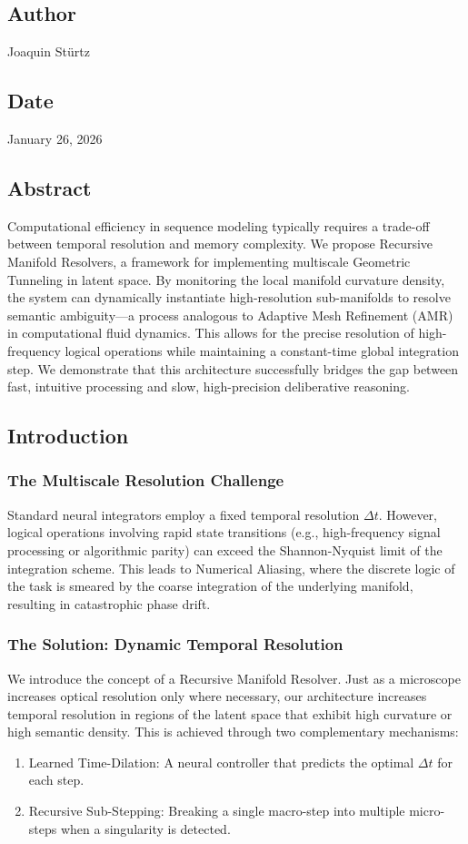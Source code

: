 \documentclass{article}
\numberwithin{equation}{section}
\begin{document}
\subsection*{Author}
Joaquin Stürtz
\subsection*{Date}
January 26, 2026
\subsection*{Abstract}
Computational efficiency in sequence modeling typically requires a trade-off between temporal resolution and memory complexity. We propose Recursive Manifold Resolvers, a framework for implementing multiscale Geometric Tunneling in latent space. By monitoring the local manifold curvature density, the system can dynamically instantiate high-resolution sub-manifolds to resolve semantic ambiguity---a process analogous to Adaptive Mesh Refinement (AMR) in computational fluid dynamics. This allows for the precise resolution of high-frequency logical operations while maintaining a constant-time global integration step. We demonstrate that this architecture successfully bridges the gap between fast, intuitive processing and slow, high-precision deliberative reasoning.

\subsection{Introduction}
\subsubsection{The Multiscale Resolution Challenge}
Standard neural integrators employ a fixed temporal resolution $\Delta t$. However, logical operations involving rapid state transitions (e.g., high-frequency signal processing or algorithmic parity) can exceed the Shannon-Nyquist limit of the integration scheme. This leads to Numerical Aliasing, where the discrete logic of the task is smeared by the coarse integration of the underlying manifold, resulting in catastrophic phase drift.

\subsubsection{The Solution: Dynamic Temporal Resolution}
We introduce the concept of a Recursive Manifold Resolver. Just as a microscope increases optical resolution only where necessary, our architecture increases temporal resolution in regions of the latent space that exhibit high curvature or high semantic density. This is achieved through two complementary mechanisms:
\begin{enumerate}
\item Learned Time-Dilation: A neural controller that predicts the optimal $\Delta t$ for each step.
\item Recursive Sub-Stepping: Breaking a single macro-step into multiple micro-steps when a singularity is detected.
\end{enumerate}
\end{document}
